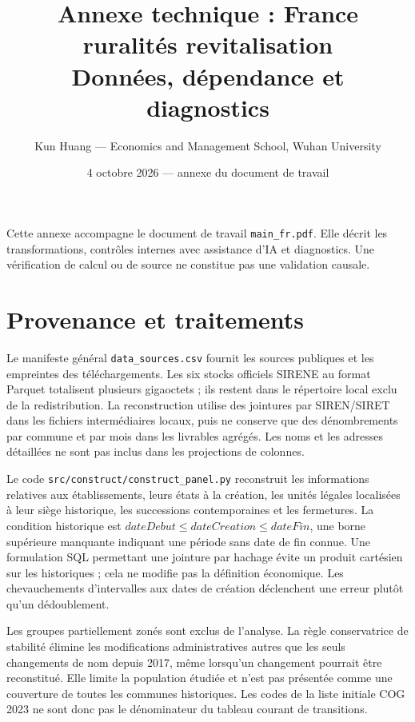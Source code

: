 
\title{Annexe technique : France ruralités revitalisation\\Données, dépendance et diagnostics}
\author{Kun Huang — Economics and Management School, Wuhan University}
\date{4 octobre 2026 — annexe du document de travail}
\maketitle
\noindent Cette annexe accompagne le document de travail \texttt{main\_fr.pdf}. Elle décrit les transformations, contrôles internes avec assistance d’IA et diagnostics. Une vérification de calcul ou de source ne constitue pas une validation causale.
\section{Provenance et traitements}
Le manifeste général \texttt{data\_sources.csv} fournit les sources publiques et les empreintes des téléchargements. Les six stocks officiels SIRENE au format Parquet totalisent plusieurs gigaoctets ; ils restent dans le répertoire local exclu de la redistribution. La reconstruction utilise des jointures par SIREN/SIRET dans les fichiers intermédiaires locaux, puis ne conserve que des dénombrements par commune et par mois dans les livrables agrégés. Les noms et les adresses détaillées ne sont pas inclus dans les projections de colonnes.

Le code \texttt{src/construct/construct\_panel.py} reconstruit les informations relatives aux établissements, leurs états à la création, les unités légales localisées à leur siège historique, les successions contemporaines et les fermetures. La condition historique est $dateDebut\leq dateCreation\leq dateFin$, une borne supérieure manquante indiquant une période sans date de fin connue. Une formulation SQL permettant une jointure par hachage évite un produit cartésien sur les historiques ; cela ne modifie pas la définition économique. Les chevauchements d’intervalles aux dates de création déclenchent une erreur plutôt qu’un dédoublement.

Les groupes partiellement zonés sont exclus de l’analyse. La règle conservatrice de stabilité élimine les modifications administratives autres que les seuls changements de nom depuis 2017, même lorsqu’un changement pourrait être reconstitué. Elle limite la population étudiée et n’est pas présentée comme une couverture de toutes les communes historiques. Les \FRRInitialN{} codes de la liste initiale COG 2023 ne sont donc pas le dénominateur du tableau courant de transitions.

